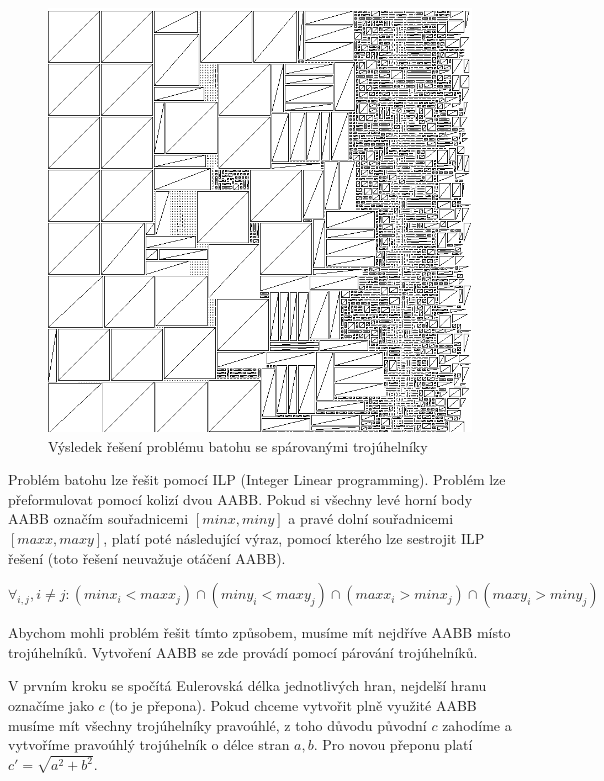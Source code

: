 \documentclass[11pt,twoside,a4paper]{book}
\begin{document}
\begin{center}
\begin{figure}[h]
\includegraphics[width=130mm]{figures/lmcoords.png}
\caption{Výsledek řešení problému batohu se spárovanými trojúhelníky}
\end{figure}
\end{center}

Problém batohu lze řešit pomocí ILP (Integer Linear programming). Problém lze přeformulovat pomocí kolizí dvou AABB. Pokud si všechny levé horní body AABB označím souřadnicemi $[minx, miny]$ a pravé dolní souřadnicemi $[maxx, maxy]$, platí poté následující výraz, pomocí kterého lze sestrojit ILP řešení (toto řešení neuvažuje otáčení AABB).

$\forall_{i,j}, i \neq j: (minx_i < maxx_j) \cap (miny_i < maxy_j) \cap (maxx_i > minx_j) \cap (maxy_i > miny_j)$
\bigskip

Abychom mohli problém řešit tímto způsobem, musíme mít nejdříve AABB místo trojúhelníků. Vytvoření AABB se zde provádí pomocí párování trojúhelníků. 

V prvním kroku se spočítá Eulerovská délka jednotlivých hran, nejdelší hranu označíme jako $c$ (to je přepona). Pokud chceme vytvořit plně využité AABB musíme mít všechny trojúhelníky pravoúhlé, z toho důvodu původní $c$ zahodíme a vytvoříme pravoúhlý trojúhelník o délce stran $a, b$. Pro novou přeponu platí $c' = \sqrt{a^2 + b^2}$.
\end{document}
